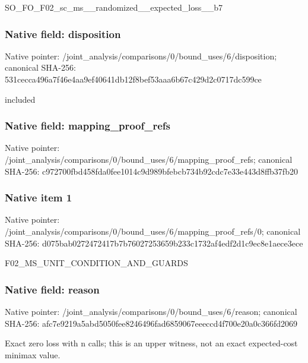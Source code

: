 \documentclass[10pt,a4paper]{article}
\begin{document}
\begingroup\raggedright\sloppy SO\_\allowbreak{}FO\_\allowbreak{}F02\_\allowbreak{}sc\_\allowbreak{}ms\_\allowbreak{}\_\allowbreak{}randomized\_\allowbreak{}\_\allowbreak{}expected\_\allowbreak{}loss\_\allowbreak{}\_\allowbreak{}b7\par\endgroup

\subsubsection{Native field: disposition}
Native pointer: /joint\_\allowbreak{}analysis/comparisons/0/bound\_\allowbreak{}uses/6/disposition; canonical SHA-256: 531cecca496a7f46e4aa9ef40641db12f8bef53aaa6b67c429d2c0717dc599ce

\begingroup\raggedright\sloppy included\par\endgroup

\subsubsection{Native field: mapping\_\allowbreak{}proof\_\allowbreak{}refs}
Native pointer: /joint\_\allowbreak{}analysis/comparisons/0/bound\_\allowbreak{}uses/6/mapping\_\allowbreak{}proof\_\allowbreak{}refs; canonical SHA-256: c972700fbd458fda0fee1014c9d989bfebcb734b92cdc7e33e443d8ffb37fb20

\subsubsection{Native item 1}
Native pointer: /joint\_\allowbreak{}analysis/comparisons/0/bound\_\allowbreak{}uses/6/mapping\_\allowbreak{}proof\_\allowbreak{}refs/0; canonical SHA-256: d075bab0272472417b7b76027253659b233c1732af4edf2d1c9ec8e1aece3ece

\begingroup\raggedright\sloppy F02\_\allowbreak{}MS\_\allowbreak{}UNIT\_\allowbreak{}CONDITION\_\allowbreak{}AND\_\allowbreak{}GUARDS\par\endgroup

\subsubsection{Native field: reason}
Native pointer: /joint\_\allowbreak{}analysis/comparisons/0/bound\_\allowbreak{}uses/6/reason; canonical SHA-256: afc7e9219a5abd5050fee8246496fad6859067eeeccd4f700e20a0c366fd2069

\begingroup\raggedright\sloppy Exact zero loss with n calls;\allowbreak{} this is an upper witness,\allowbreak{} not an exact expected-cost minimax value.\par\endgroup
\end{document}
